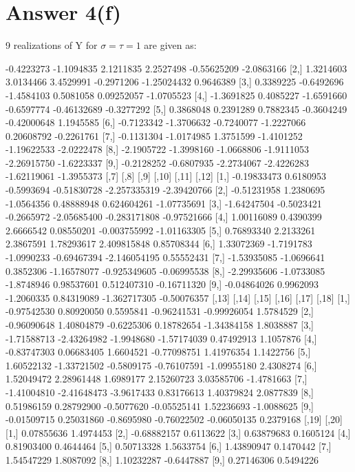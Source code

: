 \documentclass[12pt]{article}
\begin{document}
\clearpage
\section*{Answer 4(f)}

9 realizations of Y for $\sigma=\tau=1$ are given as:
\begin{Schunk}
\begin{Soutput}
            [,1]       [,2]       [,3]       [,4]        [,5]       [,6]
 [1,] -0.4223273 -1.1094835  2.1211835  2.2527498 -0.55625209 -2.0863166
 [2,]  1.3214603  3.0134466  3.4529991 -0.2971206 -1.25024432  0.9646389
 [3,]  0.3389225 -0.6492696 -1.4584103  0.5081058  0.09252057 -1.0705523
 [4,] -1.3691825  0.4085227 -1.6591660 -0.6597774 -0.46132689 -0.3277292
 [5,]  0.3868048  0.2391289  0.7882345 -0.3604249 -0.42000648  1.1945585
 [6,] -0.7123342 -1.3706632 -0.7240077 -1.2227066  0.20608792 -0.2261761
 [7,] -0.1131304 -1.0174985  1.3751599 -1.4101252 -1.19622533 -2.0222478
 [8,] -2.1905722 -1.3998160 -1.0668806 -1.9111053 -2.26915750 -1.6223337
 [9,] -0.2128252 -0.6807935 -2.2734067 -2.4226283 -1.62119061 -1.3955373
             [,7]       [,8]       [,9]       [,10]        [,11]       [,12]
 [1,] -0.19833473  0.6180953 -0.5993694 -0.51830728 -2.257335319 -2.39420766
 [2,] -0.51231958  1.2380695 -1.0564356  0.48888948  0.624604261 -1.07735691
 [3,] -1.64247504 -0.5023421 -0.2665972 -2.05685400 -0.283171808 -0.97521666
 [4,]  1.00116089  0.4390399  2.6666542  0.08550201 -0.003755992 -1.01163305
 [5,]  0.76893340  2.2133261  2.3867591  1.78293617  2.409815848  0.85708344
 [6,]  1.33072369 -1.7191783 -1.0990233 -0.69467394 -2.146054195  0.55552431
 [7,] -1.53935085 -1.0696641  0.3852306 -1.16578077 -0.925349605 -0.06995538
 [8,] -2.29935606 -1.0733085 -1.8748946  0.98537601  0.512407310 -0.16711320
 [9,] -0.04864026  0.9962093 -1.2060335  0.84319089 -1.362717305 -0.50076357
            [,13]       [,14]      [,15]       [,16]       [,17]      [,18]
 [1,] -0.97542530  0.80920050  0.5595841 -0.96241531 -0.99926054  1.5784529
 [2,] -0.96090648  1.40804879 -0.6225306  0.18782654 -1.34384158  1.8038887
 [3,] -1.71588713 -2.43264982 -1.9948680 -1.57174039  0.47492913  1.1057876
 [4,] -0.83747303  0.06683405  1.6604521 -0.77098751  1.41976354  1.1422756
 [5,]  1.60522132 -1.33721502 -0.5809175 -0.76107591 -1.09955180  2.4308274
 [6,]  1.52049472  2.28961448  1.6989177  2.15260723  3.03585706 -1.4781663
 [7,] -1.41004810 -2.41648473 -3.9617433  0.83176613  1.40379824  2.0877839
 [8,]  0.51986159  0.28792900 -0.5077620 -0.05525141  1.52236693 -1.0088625
 [9,] -0.01509715  0.25031860 -0.8695980 -0.76022502 -0.06050135  0.2379168
            [,19]      [,20]
 [1,]  0.07855636  1.4974453
 [2,] -0.68882157  0.6113622
 [3,]  0.63879683  0.1605124
 [4,]  0.81903400  0.4644464
 [5,]  0.50713328  1.5633754
 [6,]  1.43890947  0.1470442
 [7,]  1.54547229  1.8087092
 [8,]  1.10232287 -0.6447887
 [9,]  0.27146306  0.5494226
\end{Soutput}
\end{Schunk}
\end{document}
